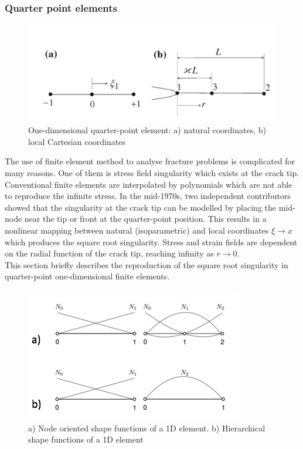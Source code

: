\documentclass[11pt]{ACMEarticle}
\numberwithin{equation}{section}
\begin{document}
\subsubsection{Quarter point elements} %
\begin{figure}
	\centering
	\includegraphics[width=0.7\linewidth]{Figures/1D-quarter}
	\caption{One-dimensional quarter-point element: a) natural coordinates, b) local Cartesian coordinates}
	\label{fig:1d-quarter}
\end{figure}
The use of finite element method to analyse fracture problems is complicated for many reasons. One of them is stress field singularity which exists at the crack tip.
Conventional finite elements are interpolated by polynomials which are not able to reproduce the infinite stress. In the mid-1970s, two independent contributors \citep{barsoum1976use,henshell1975crack} showed that the singularity at the crack tip can be modelled by placing the mid-node near the tip or front at the quarter-point position. This results in a nonlinear mapping between natural (isoparametric) and local coordinates $\xi \rightarrow x$ which produces the square root singularity. Stress and strain fields are dependent on the radial function of the crack tip, reaching infinity as $ r \rightarrow 0$. \\
This section briefly describes the reproduction of the square root singularity in quarter-point one-dimensional finite elements. 
\begin{figure}
	\centering
	\includegraphics[width=0.5\linewidth]{Figures/shape_funcs}
	\caption{a) Node oriented shape functions of a 1D element. b) Hierarchical shape functions of a 1D element}
	\label{fig:shape_funcs}
\end{figure}
\end{document}
